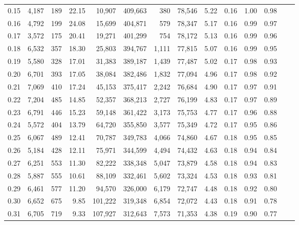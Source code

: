 \begin{tabular}{rrrrrrrrrrrrrr}
0.15 &   4,187 &    189 &   22.15 &   10,907 &  409,663 &     380 &  78,546 &  5.22 &  0.16 &  1.00 &      0.98 \\
0.16 &   4,792 &    199 &   24.08 &   15,699 &  404,871 &     579 &  78,347 &  5.17 &  0.16 &  0.99 &      0.97 \\
0.17 &   3,572 &    175 &   20.41 &   19,271 &  401,299 &     754 &  78,172 &  5.13 &  0.16 &  0.99 &      0.96 \\
0.18 &   6,532 &    357 &   18.30 &   25,803 &  394,767 &   1,111 &  77,815 &  5.07 &  0.16 &  0.99 &      0.95 \\
0.19 &   5,580 &    328 &   17.01 &   31,383 &  389,187 &   1,439 &  77,487 &  5.02 &  0.17 &  0.98 &      0.93 \\
0.20 &   6,701 &    393 &   17.05 &   38,084 &  382,486 &   1,832 &  77,094 &  4.96 &  0.17 &  0.98 &      0.92 \\
0.21 &   7,069 &    410 &   17.24 &   45,153 &  375,417 &   2,242 &  76,684 &  4.90 &  0.17 &  0.97 &      0.91 \\
0.22 &   7,204 &    485 &   14.85 &   52,357 &  368,213 &   2,727 &  76,199 &  4.83 &  0.17 &  0.97 &      0.89 \\
0.23 &   6,791 &    446 &   15.23 &   59,148 &  361,422 &   3,173 &  75,753 &  4.77 &  0.17 &  0.96 &      0.88 \\
0.24 &   5,572 &    404 &   13.79 &   64,720 &  355,850 &   3,577 &  75,349 &  4.72 &  0.17 &  0.95 &      0.86 \\
0.25 &   6,067 &    489 &   12.41 &   70,787 &  349,783 &   4,066 &  74,860 &  4.67 &  0.18 &  0.95 &      0.85 \\
0.26 &   5,184 &    428 &   12.11 &   75,971 &  344,599 &   4,494 &  74,432 &  4.63 &  0.18 &  0.94 &      0.84 \\
0.27 &   6,251 &    553 &   11.30 &   82,222 &  338,348 &   5,047 &  73,879 &  4.58 &  0.18 &  0.94 &      0.83 \\
0.28 &   5,887 &    555 &   10.61 &   88,109 &  332,461 &   5,602 &  73,324 &  4.53 &  0.18 &  0.93 &      0.81 \\
0.29 &   6,461 &    577 &   11.20 &   94,570 &  326,000 &   6,179 &  72,747 &  4.48 &  0.18 &  0.92 &      0.80 \\
0.30 &   6,652 &    675 &    9.85 &  101,222 &  319,348 &   6,854 &  72,072 &  4.43 &  0.18 &  0.91 &      0.78 \\
0.31 &   6,705 &    719 &    9.33 &  107,927 &  312,643 &   7,573 &  71,353 &  4.38 &  0.19 &  0.90 &      0.77 \\

\end{tabular}
